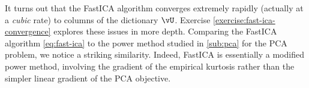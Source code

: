 \documentclass[\toplevelprefix/book-main.tex]{subfiles}
\begin{document}
It turns out that the FastICA algorithm converges extremely rapidly (actually at a \textit{cubic} rate) to columns of the dictionary $\vU$. 
Exercise \ref{exercise:fast-ica-convergence} explores these issues in more depth.  %
Comparing the FastICA algorithm \eqref{eq:fast-ica} to the power method studied in \ref{sub:pca} for the PCA problem, we notice a striking similarity. Indeed, FastICA is essentially a modified power method, involving the gradient of the empirical kurtosis rather than the simpler linear gradient of the PCA objective.







%
\end{document}
